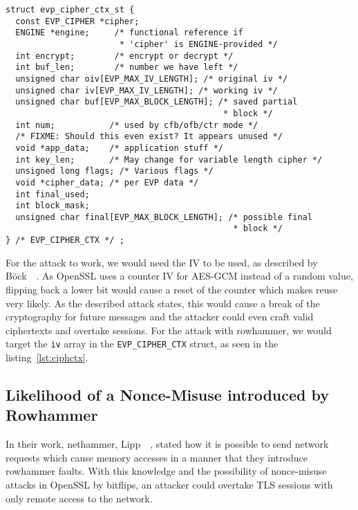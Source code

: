\begin{minipage}{\linewidth}
\begin{lstlisting}[style=CStyle,
                   caption={Context struct describing the Cipher used in TLS.
This struct is used as the SSL context inside OpenSSL. Source is taken from
OpenSSL version $1.1.0g$},
                   label={lst:ciphctx}]
struct evp_cipher_ctx_st {
  const EVP_CIPHER *cipher;
  ENGINE *engine;     /* functional reference if
                       * 'cipher' is ENGINE-provided */
  int encrypt;        /* encrypt or decrypt */
  int buf_len;        /* number we have left */
  unsigned char oiv[EVP_MAX_IV_LENGTH]; /* original iv */
  unsigned char iv[EVP_MAX_IV_LENGTH]; /* working iv */
  unsigned char buf[EVP_MAX_BLOCK_LENGTH]; /* saved partial
                                            * block */
  int num;           /* used by cfb/ofb/ctr mode */
  /* FIXME: Should this even exist? It appears unused */
  void *app_data;    /* application stuff */
  int key_len;       /* May change for variable length cipher */
  unsigned long flags; /* Various flags */
  void *cipher_data; /* per EVP data */
  int final_used;
  int block_mask;
  unsigned char final[EVP_MAX_BLOCK_LENGTH]; /* possible final
                                              * block */
} /* EVP_CIPHER_CTX */ ;
\end{lstlisting}
\end{minipage}

For the attack to work, we would need the IV to be used, as described by
Böck~\etal~\cite{gcmnonceattack}. As OpenSSL uses a counter IV for AES-GCM
instead of a random value, flipping back a lower bit would cause a reset of the
counter which makes reuse very likely. As the described attack states, this
would cause a break of the cryptography for future messages and the attacker
could even craft valid ciphertexts and overtake sessions. For the attack with
rowhammer, we would target the \texttt{iv} array in the
\texttt{EVP\_CIPHER\_CTX} struct, as seen in the listing~\ref{lst:ciphctx}.

\subsection{Likelihood of a Nonce-Misuse introduced by Rowhammer}

In their work, nethammer, Lipp~\etal~\cite{nethammer}, stated how it is possible
to send network requests which cause memory accesses in a manner that they
introduce rowhammer faults. With this knowledge and the possibility of
nonce-misuse attacks in OpenSSL by bitflips, an attacker could overtake TLS
sessions with only remote access to the network.

